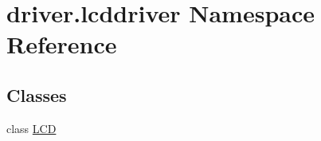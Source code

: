 \hypertarget{namespacedriver_1_1lcddriver}{}\section{driver.\+lcddriver Namespace Reference}
\label{namespacedriver_1_1lcddriver}
\subsection*{Classes}
\begin{DoxyCompactItemize}
\item 
class \hyperlink{classdriver_1_1lcddriver_1_1LCD}{L\+C\+D}
\end{DoxyCompactItemize}
